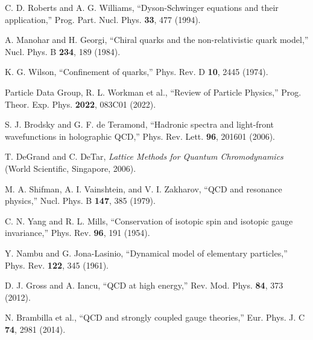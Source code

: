 \documentclass[12pt,a4paper]{article}
\begin{document}
\begin{thebibliography}{99}
 C. D. Roberts and A. G. Williams, ``Dyson-Schwinger equations and their application,'' Prog. Part. Nucl. Phys. \textbf{33}, 477 (1994).

 A. Manohar and H. Georgi, ``Chiral quarks and the non-relativistic quark model,'' Nucl. Phys. B \textbf{234}, 189 (1984).

 K. G. Wilson, ``Confinement of quarks,'' Phys. Rev. D \textbf{10}, 2445 (1974).

 Particle Data Group, R. L. Workman et al., ``Review of Particle Physics,'' Prog. Theor. Exp. Phys. \textbf{2022}, 083C01 (2022).

 S. J. Brodsky and G. F. de Teramond, ``Hadronic spectra and light-front wavefunctions in holographic QCD,'' Phys. Rev. Lett. \textbf{96}, 201601 (2006).

 T. DeGrand and C. DeTar, \textit{Lattice Methods for Quantum Chromodynamics} (World Scientific, Singapore, 2006).

 M. A. Shifman, A. I. Vainshtein, and V. I. Zakharov, ``QCD and resonance physics,'' Nucl. Phys. B \textbf{147}, 385 (1979).

 C. N. Yang and R. L. Mills, ``Conservation of isotopic spin and isotopic gauge invariance,'' Phys. Rev. \textbf{96}, 191 (1954).

 Y. Nambu and G. Jona-Lasinio, ``Dynamical model of elementary particles,'' Phys. Rev. \textbf{122}, 345 (1961).

 D. J. Gross and A. Iancu, ``QCD at high energy,'' Rev. Mod. Phys. \textbf{84}, 373 (2012).

 N. Brambilla et al., ``QCD and strongly coupled gauge theories,'' Eur. Phys. J. C \textbf{74}, 2981 (2014).

\end{thebibliography}
\end{document}
